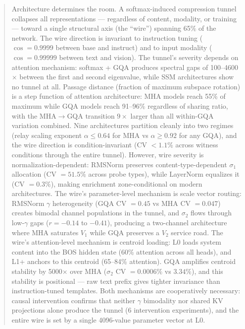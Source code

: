 \documentclass[12pt]{article}
\begin{document}
\begin{abstract}
Architecture determines the room. A softmax-induced compression tunnel collapses all representations --- regardless of content, modality, or training --- toward a single structural axis (the ``wire'') spanning 65\% of the network. The wire direction is invariant to instruction tuning ($\cos = 0.9999$ between base and instruct) and to input modality ($\cos = 0.99999$ between text and vision). The tunnel's severity depends on attention mechanism: softmax + GQA produces spectral gaps of 100--4600$\times$ between the first and second eigenvalue, while SSM architectures show no tunnel at all. Passage distance (fraction of maximum subspace rotation) is a step function of attention architecture: MHA models reach 55\% of maximum while GQA models reach 91--96\% regardless of sharing ratio, with the MHA$\to$GQA transition $9\times$ larger than all within-GQA variation combined. Nine architectures partition cleanly into two regimes (relay scaling exponent $\alpha \le 0.64$ for MHA vs $\alpha \ge 0.92$ for any GQA), and the wire direction is condition-invariant (CV $< 1.1\%$ across witness conditions through the entire tunnel). However, wire severity is normalization-dependent: RMSNorm preserves content-type-dependent $\sigma_1$ allocation (CV $= 51.5\%$ across probe types), while LayerNorm equalizes it (CV $= 0.3\%$), making enrichment zone-conditional on modern architectures. The wire's parameter-level mechanism is scale vector routing: RMSNorm $\gamma$ heterogeneity (GQA CV $= 0.45$ vs MHA CV $= 0.047$) creates bimodal channel populations in the tunnel, and $\sigma_2$ flows through low-$\gamma$ gaps ($r = -0.14$ to $-0.41$), producing a two-channel architecture where MHA saturates $V_1$ while GQA preserves a $V_2$ service road. The wire's attention-level mechanism is centroid loading: L0 loads system content into the BOS hidden state (60\% attention across all heads), and L1+ anchors to this centroid (65--84\% attention). GQA amplifies centroid stability by 5000$\times$ over MHA ($\sigma_2$ CV $= 0.0006\%$ vs $3.34\%$), and this stability is positional --- raw text prefix gives tighter invariance than instruction-tuned templates. Both mechanisms are cooperatively necessary: causal intervention confirms that neither $\gamma$ bimodality nor shared KV projections alone produce the tunnel (6 intervention experiments), and the entire wire is set by a single 4096-value parameter vector at L0.


\end{abstract}
\end{document}
